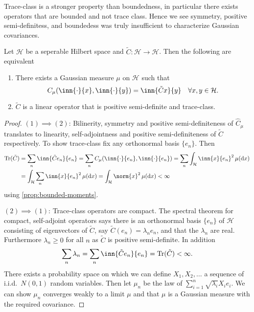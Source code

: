 \documentclass[fontsize=12pt, DIV=10]{scrreprt}
\theoremstyle{remark}
\newcommand{\calH}{\mathcal H}
\newcommand{\dif}[1]{\text{d} #1}
\DeclareMathOperator{\tr}{Tr}
\begin{document}
Trace-class is a stronger property than boundedness, in particular there exists operators that are bounded and not trace class. Hence we see symmetry, positive semi-definitess, and boundedess was truly insufficient to characterize Gaussian covariances.
\begin{prop}
	Let $\calH$ be a seperable Hilbert space and $\tilde{C}: \calH \to \calH$. Then the following are equivalent
	\begin{enumerate}
		\item There exists a Gaussian measure $\mu$ on $\calH$ such that
			\begin{equation}
				C_{\mu}(\inn{\cdot}{x}, \inn{\cdot}{y}) = \inn{\tilde{C} x}{y} \quad \forall x, y \in \calH.
			\end{equation}
		\item $\tilde{C}$ is a linear operator that is positive semi-definite and trace-class.
	\end{enumerate}
\end{prop}
\begin{proof}
	$(1) \implies (2)$: Bilinerity, symmetry and positive semi-definiteness of $\hat{C}_{\mu}$ translates to linearity, self-adjointness and positive semi-definiteness of $\tilde{C}$ respectively. To show trace-class fix any orthonormal basis $\{e_n\}$. Then
	\begin{align}
		\tr(\tilde{C})
		&= \sum_n \inn{\tilde{C}e_n}{e_n}
		= \sum_n C_{\mu}(\inn{\cdot}{e_n}, \inn{\cdot}{e_n})
		= \sum_n \int_{\calH} \inn{x}{e_n}^2 \, \mu(\dif x) \nonumber \\
		&= \int_{\calH} \sum_n \inn{x}{e_n}^2 \, \mu(\dif x)
		= \int_{\calH} \norm{x}^2 \, \mu(\dif x) < \infty
	\end{align}
	using \vref{prop:bounded-moments}.

	$(2) \implies (1)$: Trace-class operators are compact. The spectral theorem for compact, self-adjoint operators says there is an orthonormal basis $\{e_n\}$ of $\calH$ consisting of eigenvectors of $\tilde{C}$, say $\tilde{C}(e_n) = \lambda _n e_n$, and that the $\lambda_n$ are real. Furthermore $\lambda_n \geq 0$ for all $n$ as $\tilde{C}$ is positive semi-definite. In addition
	\begin{equation}
		\sum_n \lambda_n = \sum_n \inn{\tilde{C} e_n}{e_n} = \tr(\tilde{C}) < \infty.
	\end{equation}
	There exists a probability space on which we can define $X_1, X_2, \ldots$ a sequence of i.i.d.\ $N(0, 1)$ random variables. Then let $\mu_n$ be the law of $\sum_{i=1}^n \sqrt{\lambda_i} X_i e_i$. We can show $\mu_n$ converges weakly to a limit $\mu$ and that $\mu$ is a Gaussian measure with the required covariance.
\end{proof}
\end{document}

